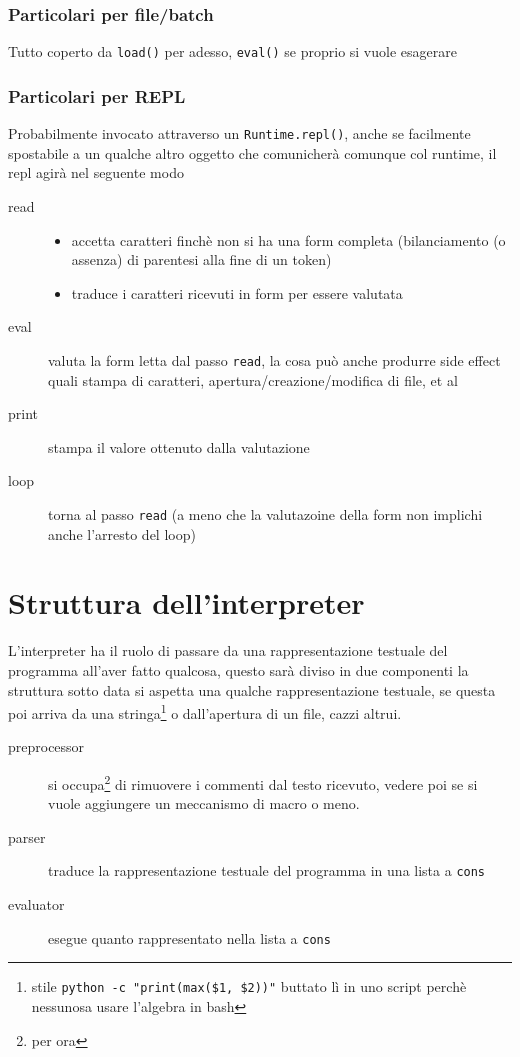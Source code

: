 \documentclass[11pt]{article}
\begin{document}
\subsubsection{Particolari per file/batch}
\label{sec:org60d8bc1}
Tutto coperto da \texttt{load()} per adesso, \texttt{eval()} se proprio si vuole esagerare

\subsubsection{Particolari per REPL}
\label{sec:org9672088}
Probabilmente invocato attraverso un \texttt{Runtime.repl()}, anche se facilmente spostabile a un qualche altro oggetto che comunicherà comunque col runtime, il repl agirà nel seguente modo
\begin{description}
\item[{read}] \begin{itemize}
\item accetta caratteri finchè non si ha una form completa (bilanciamento (o assenza) di parentesi alla fine di un token)
\item traduce i caratteri ricevuti in form per essere valutata
\end{itemize}
\item[{eval}] valuta la form letta dal passo \texttt{read}, la cosa può anche produrre side effect quali stampa di caratteri, apertura/creazione/modifica di file, et al
\item[{print}] stampa il valore ottenuto dalla valutazione
\item[{loop}] torna al passo \texttt{read} (a meno che la valutazoine della form non implichi anche l'arresto del loop)
\end{description}

\section{Struttura dell'interpreter}
\label{sec:org07fbdce}
L'interpreter ha il ruolo di passare da una rappresentazione testuale del programma all'aver fatto qualcosa, questo sarà diviso in due componenti
la struttura sotto data si aspetta una qualche rappresentazione testuale, se questa poi arriva da una stringa\footnote{stile \texttt{python -c "print(max(\$1, \$2))"} buttato lì in uno script perchè nessuno\footnotemark sa usare l'algebra in bash} o dall'apertura di un file, cazzi altrui.
\begin{description}
\item[{preprocessor}] si occupa\footnote{per ora} di rimuovere i commenti dal testo ricevuto, vedere poi se si vuole aggiungere un meccanismo di macro o meno.
\item[{parser}] traduce la rappresentazione testuale del programma in una lista a \texttt{cons}
\item[{evaluator}] esegue quanto rappresentato nella lista a \texttt{cons}
\end{description}
\end{document}
